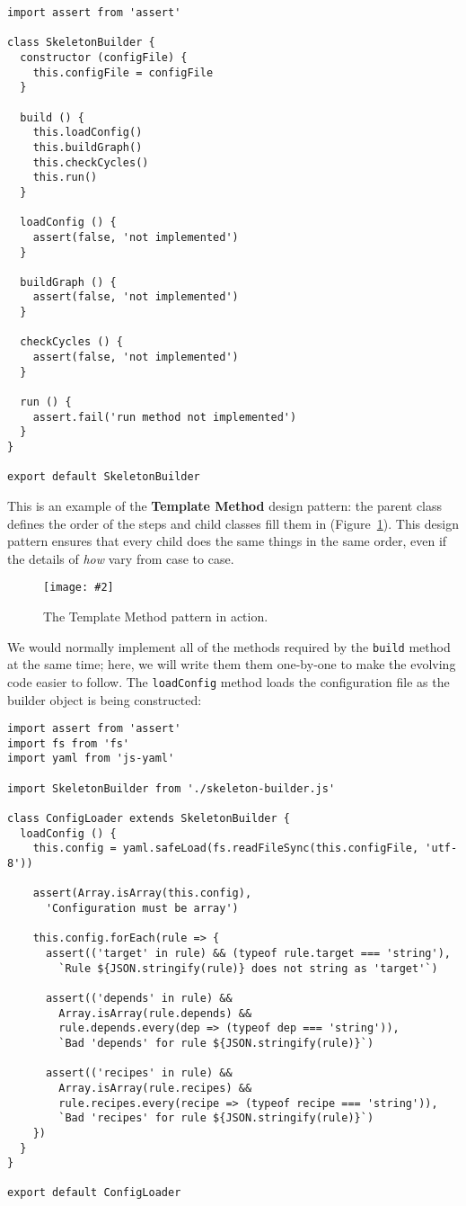 \documentclass[krantzl]{krantz}
\newcommand{\figpdf}[4]{\begin{figure}%
\centering%
\texttt{[image: \#2]}%
\caption{#3}%
\label{#1}%
\end{figure}}
\newcommand{\figref}[1]{Figure~\ref{#1}}
\newcommand{\glossref}[1]{\textbf{#1}}
\begin{document}
\begin{lstlisting}[frame=tblr]
import assert from 'assert'

class SkeletonBuilder {
  constructor (configFile) {
    this.configFile = configFile
  }

  build () {
    this.loadConfig()
    this.buildGraph()
    this.checkCycles()
    this.run()
  }

  loadConfig () {
    assert(false, 'not implemented')
  }

  buildGraph () {
    assert(false, 'not implemented')
  }

  checkCycles () {
    assert(false, 'not implemented')
  }

  run () {
    assert.fail('run method not implemented')
  }
}

export default SkeletonBuilder
\end{lstlisting}



This is an example of
the \glossref{Template Method} design pattern:
the parent class defines the order of the steps
and child classes fill them in
(\figref{build-manager-template-method}).
This design pattern ensures that every child does the same things in the same order,
even if the details of \emph{how} vary from case to case.

\figpdf{build-manager-template-method}{./build-manager/template-method.pdf}{The Template Method pattern in action.}{0.6}


We would normally implement all of the methods required by the \texttt{build} method at the same time;
here, we will write them them one-by-one to make the evolving code easier to follow.
The \texttt{loadConfig} method loads the configuration file
as the builder object is being constructed:


\begin{lstlisting}[frame=tblr]
import assert from 'assert'
import fs from 'fs'
import yaml from 'js-yaml'

import SkeletonBuilder from './skeleton-builder.js'

class ConfigLoader extends SkeletonBuilder {
  loadConfig () {
    this.config = yaml.safeLoad(fs.readFileSync(this.configFile, 'utf-8'))

    assert(Array.isArray(this.config),
      'Configuration must be array')

    this.config.forEach(rule => {
      assert(('target' in rule) && (typeof rule.target === 'string'),
        `Rule ${JSON.stringify(rule)} does not string as 'target'`)

      assert(('depends' in rule) &&
        Array.isArray(rule.depends) &&
        rule.depends.every(dep => (typeof dep === 'string')),
        `Bad 'depends' for rule ${JSON.stringify(rule)}`)

      assert(('recipes' in rule) &&
        Array.isArray(rule.recipes) &&
        rule.recipes.every(recipe => (typeof recipe === 'string')),
        `Bad 'recipes' for rule ${JSON.stringify(rule)}`)
    })
  }
}

export default ConfigLoader
\end{lstlisting}
\end{document}

